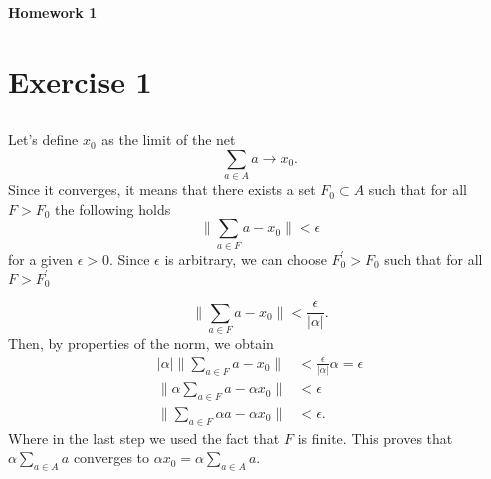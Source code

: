 \documentclass[a4paper,12pt]{article} %
\begin{document}
\begin{center} %
    {\Large \bf Homework 1}
\end{center}

\vspace{0.4cm}


\onehalfspacing
\section{Exercise 1}
\subsection{}
Let's define \(x_0\) as the limit of the net
\begin{equation}
    \sum_{a \in  A}a \to x_0.
\end{equation}
Since it converges, it means that there exists a set \(F_0 \subset A\) such that for all \(F > F_0\) the following holds
\begin{equation}
    \| \sum_{a \in  F}a - x_0  \| < \epsilon
\end{equation}
for a given \(\epsilon >0\). Since \(\epsilon \) is arbitrary, we can choose \(F^{\prime} _0> F_0\) such that for all \(F > F_0^{\prime} \)

\begin{equation}
    \| \sum_{a \in  F}a - x_0  \| < \frac{\epsilon}{|\alpha| }.
\end{equation}
Then, by properties of the norm, we obtain
\begin{align*}
    \vert \alpha \vert \| \sum_{a \in  F}a - x_0  \| & < \frac{\epsilon}{|\alpha| }\alpha = \epsilon \\
    \| \alpha \sum_{a \in  F}a - \alpha x_0  \|      & < \epsilon                                    \\
    \|  \sum_{a \in  F}\alpha a - \alpha x_0  \|     & < \epsilon.
\end{align*}
Where in the last step we used the fact that \(F\) is finite.
This proves that \(\alpha \sum_{a \in  A} a\) converges to \(\alpha x_0 = \alpha \sum_{a \in  A} a \).
\end{document}
